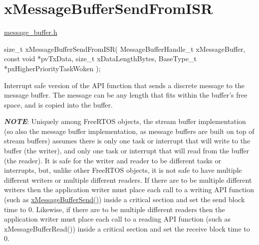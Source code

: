 \hypertarget{group__x_message_buffer_send_from_i_s_r}{}\section{x\+Message\+Buffer\+Send\+From\+I\+SR}
\label{group__x_message_buffer_send_from_i_s_r}
\hyperlink{message__buffer_8h}{message\+\_\+buffer.\+h}


\begin{DoxyPre}
size\_t xMessageBufferSendFromISR( MessageBufferHandle\_t xMessageBuffer,
                                  const void *pvTxData,
                                  size\_t xDataLengthBytes,
                                  BaseType\_t *pxHigherPriorityTaskWoken );

\begin{DoxyPre}\end{DoxyPre}
\end{DoxyPre}



\begin{DoxyPre}
\begin{DoxyPre}   Interrupt safe version of the API function that sends a discrete message to
   the message buffer.  The message can be any length that fits within the
   buffer's free space, and is copied into the buffer.\end{DoxyPre}
\end{DoxyPre}



\begin{DoxyPre}
\begin{DoxyPre}   {\itshape {\bfseries NOTE}}:  Uniquely among FreeRTOS objects, the stream buffer
   implementation (so also the message buffer implementation, as message buffers
   are built on top of stream buffers) assumes there is only one task or
   interrupt that will write to the buffer (the writer), and only one task or
   interrupt that will read from the buffer (the reader).  It is safe for the
   writer and reader to be different tasks or interrupts, but, unlike other
   FreeRTOS objects, it is not safe to have multiple different writers or
   multiple different readers.  If there are to be multiple different writers
   then the application writer must place each call to a writing API function
   (such as \hyperlink{message__buffer_8h_a858f6da6fe24a226c45caf1634ea1605}{xMessageBufferSend()}) inside a critical section and set the send
   block time to 0.  Likewise, if there are to be multiple different readers
   then the application writer must place each call to a reading API function
   (such as xMessageBufferRead()) inside a critical section and set the receive
   block time to 0.\end{DoxyPre}
\end{DoxyPre}



